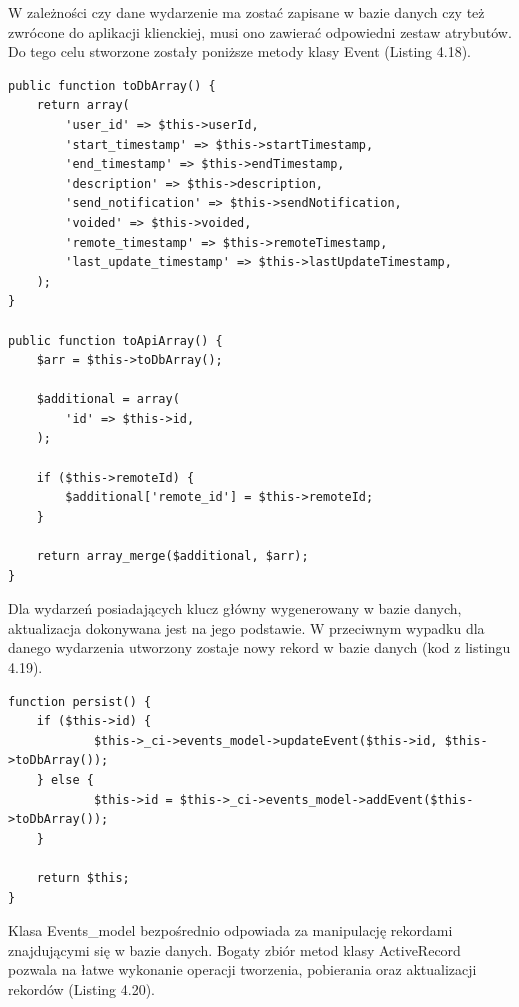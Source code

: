 W zależności czy dane wydarzenie ma zostać zapisane w bazie danych czy też zwrócone do aplikacji klienckiej, musi ono zawierać odpowiedni zestaw atrybutów. Do tego celu stworzone zostały poniższe metody klasy Event (Listing 4.18).

\begin{lstlisting}[style=php, caption=Serializacja obiektu Event., label=amb, captionpos=b]
public function toDbArray() {
    return array(
        'user_id' => $this->userId,
        'start_timestamp' => $this->startTimestamp,
        'end_timestamp' => $this->endTimestamp,
        'description' => $this->description,
        'send_notification' => $this->sendNotification,
        'voided' => $this->voided,
        'remote_timestamp' => $this->remoteTimestamp,
        'last_update_timestamp' => $this->lastUpdateTimestamp,
    );
}

public function toApiArray() {
    $arr = $this->toDbArray();

    $additional = array(
    	'id' => $this->id,
    );

    if ($this->remoteId) {
    	$additional['remote_id'] = $this->remoteId;
    }

    return array_merge($additional, $arr);
}
\end{lstlisting}

Dla wydarzeń posiadających klucz główny wygenerowany w bazie danych, aktualizacja dokonywana jest na jego podstawie. W przeciwnym wypadku dla danego wydarzenia utworzony zostaje nowy rekord w bazie danych (kod z listingu 4.19).

\begin{lstlisting}[style=php, caption=Aktualizacja obiektu Event w bazie danych., label=amb, captionpos=b]
function persist() {
   	if ($this->id) {
       		$this->_ci->events_model->updateEvent($this->id, $this->toDbArray());
   	} else {
       		$this->id = $this->_ci->events_model->addEvent($this->toDbArray());
   	}

   	return $this;
}
\end{lstlisting}

Klasa Events\_model bezpośrednio odpowiada za manipulację rekordami znajdującymi się w bazie danych. Bogaty zbiór metod klasy ActiveRecord pozwala na łatwe wykonanie operacji tworzenia, pobierania oraz aktualizacji rekordów (Listing 4.20).

